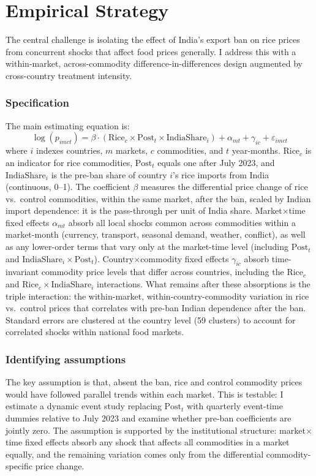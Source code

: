 \documentclass[12pt]{article}
\begin{document}



\section{Empirical Strategy}

The central challenge is isolating the effect of India's export ban on rice prices from concurrent shocks that affect food prices generally. I address this with a within-market, across-commodity difference-in-differences design augmented by cross-country treatment intensity.

\subsubsection*{Specification} The main estimating equation is:
\begin{equation}
\log(p_{imct}) = \beta \cdot (\text{Rice}_c \times \text{Post}_t \times \text{IndiaShare}_i) + \alpha_{mt} + \gamma_{ic} + \varepsilon_{imct}
\label{eq:main}
\end{equation}
where $i$ indexes countries, $m$ markets, $c$ commodities, and $t$ year-months. $\text{Rice}_c$ is an indicator for rice commodities, $\text{Post}_t$ equals one after July 2023, and $\text{IndiaShare}_i$ is the pre-ban share of country $i$'s rice imports from India (continuous, 0--1). The coefficient $\beta$ measures the differential price change of rice vs.\ control commodities, within the same market, after the ban, scaled by Indian import dependence: it is the pass-through per unit of India share. Market$\times$time fixed effects $\alpha_{mt}$ absorb all local shocks common across commodities within a market-month (currency, transport, seasonal demand, weather, conflict), as well as any lower-order terms that vary only at the market-time level (including $\text{Post}_t$ and $\text{IndiaShare}_i \times \text{Post}_t$). Country$\times$commodity fixed effects $\gamma_{ic}$ absorb time-invariant commodity price levels that differ across countries, including the $\text{Rice}_c$ and $\text{Rice}_c \times \text{IndiaShare}_i$ interactions. What remains after these absorptions is the triple interaction: the within-market, within-country-commodity variation in rice vs.\ control prices that correlates with pre-ban Indian dependence after the ban. Standard errors are clustered at the country level (59 clusters) to account for correlated shocks within national food markets.

\subsubsection*{Identifying assumptions} The key assumption is that, absent the ban, rice and control commodity prices would have followed parallel trends within each market. This is testable: I estimate a dynamic event study replacing $\text{Post}_t$ with quarterly event-time dummies relative to July 2023 and examine whether pre-ban coefficients are jointly zero. The assumption is supported by the institutional structure: market$\times$time fixed effects absorb any shock that affects all commodities in a market equally, and the remaining variation comes only from the differential commodity-specific price change.
\end{document}
